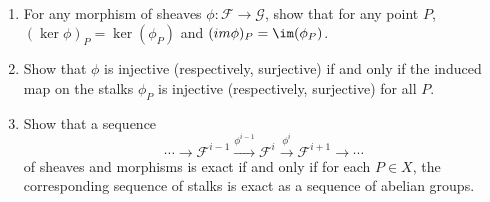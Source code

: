 \begin{exercise}%
	~
	\begin{enumerate}
		\item For any morphism of sheaves $\phi: \mathcal{F}\to \mathcal{G} $, show that for any point $P $, $(\ker \phi)_P = \ker(\phi_P) $ and $(im \phi)_P = \im(\phi_P) $.
		\item Show that $\phi $ is injective (respectively, surjective) if and only if the induced map on the stalks $\phi_P $ is injective (respectively, surjective) for all $P $.
		\item Show that a sequence
			\[
				\cdots \to \mathcal{F}^{i-1}\xrightarrow{\phi ^{i-1}} \mathcal{F}^i \xrightarrow{\phi^i} \mathcal{F}^{i+1}\to \cdots   
			\] 
			of sheaves and morphisms is exact if and only if for each $P \in X $, the corresponding sequence of stalks is exact as a sequence of abelian groups.
	\end{enumerate}
\end{exercise}
